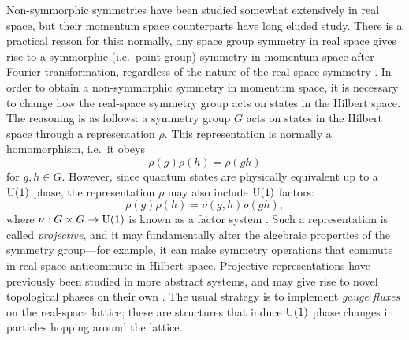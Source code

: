 Non-symmorphic symmetries have been studied somewhat extensively in real space, but their momentum space counterparts have long eluded study. There is a practical reason for this: normally, any space group symmetry in real space gives rise to a symmorphic (i.e.\ point group) symmetry in momentum space after Fourier transformation, regardless of the nature of the real space symmetry \cite{Zhang_nonsymmorphic}. In order to obtain a non-symmorphic symmetry in momentum space, it is necessary to change how the real-space symmetry group acts on states in the Hilbert space. The reasoning is as follows: a symmetry group $G$ acts on states in the Hilbert space through a representation $\rho$. This representation is normally a homomorphism, i.e.\ it obeys
\begin{equation*}
	\rho(g)\rho(h) = \rho(gh)
\end{equation*}
for $g,h\in G$. However, since quantum states are physically equivalent up to a $\operatorname{U}(1)$ phase, the representation $\rho$ may also include $\operatorname{U}(1)$ factors:
\begin{equation*}
	\rho(g)\rho(h) = \nu(g,h)\rho(gh),
\end{equation*}
where $\nu: G\times G\to \operatorname{U}(1)$ is known as a factor system \cite{Chen_gauge-classification}. Such a representation is called \emph{projective}, and it may fundamentally alter the algebraic properties of the symmetry group---for example, it can make symmetry operations that commute in real space anticommute in Hilbert space. Projective representations have previously been studied in more abstract systems, and may give rise to novel topological phases on their own \cite{ZHY_Z2-projective,Zhao_projective-PT,Shao_gauge,Xue-Wang_acoustic-Mobius,Li-Du_acoustic-Mobius,Chen_gauge-classification}. The usual strategy is to implement \emph{gauge fluxes} on the real-space lattice; these are structures that induce $\operatorname{U}(1)$ phase changes in particles hopping around the lattice.


